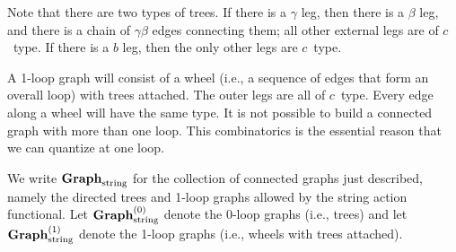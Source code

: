 Note that there are two types of trees.
If there is a $\gamma$ leg, then there is a $\beta$ leg,
and there is a chain of $\gamma\beta$ edges connecting them;
all other external legs are of $c$~type.
If there is a $b$ leg, then the only other legs are $c$~type.

A 1-loop graph will consist of a wheel (i.e., a sequence of edges that form an overall loop)
with trees attached.
The outer legs are all of $c$~type.
Every edge along a wheel will have the same type.
It is not possible to build a connected graph with more than one loop.
This combinatorics is the essential reason that we can quantize at one loop.

We write ${\bf Graph}_{\rm string}$ for the collection of connected graphs just described,
namely the directed trees and 1-loop graphs allowed by the string action functional.
Let ${\bf Graph}_{\rm string}^{(0)}$ denote the 0-loop graphs (i.e., trees) and let ${\bf Graph}_{\rm string}^{(1)}$ denote the 1-loop graphs (i.e., wheels with trees attached).




